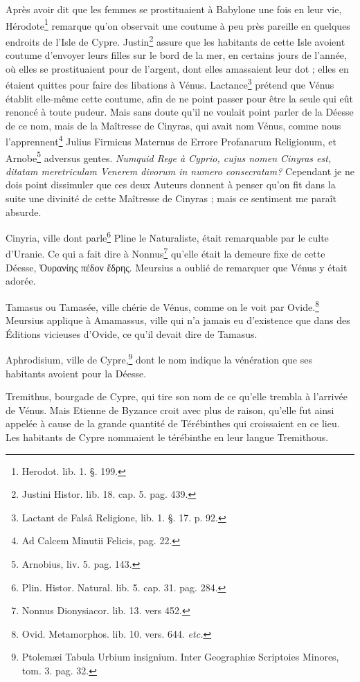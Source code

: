 \documentclass[a4paper, 11pt, oneside, polutonikogreek, french]{article}
\begin{document}
Après avoir dit que les femmes se prostituaient à Babylone une fois en leur vie, Hérodote\footnote{Herodot. lib. 1. §. 199.} remarque qu'on observait une coutume à peu près pareille en quelques endroits de l'Isle de Cypre. Justin\footnote{Justini Histor. lib. 18. cap. 5. pag. 439.} assure que les habitants de cette Isle avoient coutume d'envoyer leurs filles sur le bord de la mer, en certains jours de l'année, où elles se prostituaient pour de l'argent, dont elles amassaient leur dot ; elles en étaient quittes pour faire des libations à Vénus. Lactance\footnote{Lactant de Falsâ Religione, lib. 1. §. 17. p. 92.} prétend que Vénus établit elle-même cette coutume, afin de ne point passer pour être la seule qui eût renoncé à toute pudeur. Mais sans doute qu'il ne voulait point parler de la Déesse de ce nom, mais de la Maîtresse de Cinyras, qui avait nom Vénus, comme nous l'apprennent\footnote{Ad Calcem Minutii Felicis, pag. 22.} Julius Firmicus Maternus de Errore Profanarum Religionum, et Arnobe\footnote{Arnobius, liv. 5. pag. 143.} adversus gentes. \emph{Numquid Rege à Cyprio, cujus nomen Cinyras est, ditatam meretriculam Venerem divorum in numero consecratam?} Cependant je ne dois point dissimuler que ces deux Auteurs donnent à penser qu'on fit dans la suite une divinité de cette Maîtresse de Cinyras ; mais ce sentiment me paraît absurde.

Cinyria, ville dont parle\footnote{Plin. Histor. Natural. lib. 5. cap. 31. pag. 284.} Pline le Naturaliste, était remarquable par le culte d'Uranie. Ce qui a fait dire à Nonnus\footnote{Nonnus Dionysiacor. lib. 13. vers 452.} qu'elle était la demeure fixe de cette Déesse, Ὀυρανίης πέδον ἕδρης. Meursius a oublié de remarquer que Vénus y était adorée.

Tamasus ou Tamasée, ville chérie de Vénus, comme on le voit par Ovide.\footnote{Ovid. Metamorphos. lib. 10. vers. 644. \emph{etc.}} Meursius applique à Amamassus, ville qui n'a jamais eu d'existence que dans des Éditions vicieuses d'Ovide, ce qu'il devait dire de Tamasus.

Aphrodisium, ville de Cypre,\footnote{Ptolemæi Tabula Urbium insignium. Inter Geographiæ Scriptoies Minores, tom. 3. pag. 32.} dont le nom indique la vénération que ses habitants avoient pour la Déesse.

Tremithus, bourgade de Cypre, qui tire son nom de ce qu'elle trembla à l'arrivée de Vénus. Mais Etienne de Byzance croit avec plus de raison, qu'elle fut ainsi appelée à cause de la grande quantité de Térébinthes qui croissaient en ce lieu. Les habitants de Cypre nommaient le térébinthe en leur langue Tremithous.
\end{document}
